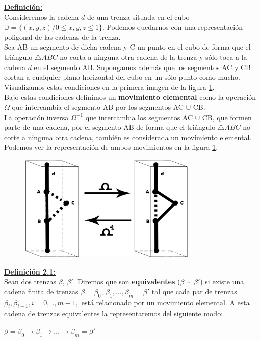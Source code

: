 \textbf{\underline{Definición:}}\\
Consideremos la cadena $d$ de una trenza situada en el cubo $\mathds{D} = \{(x,y,z) / 0 \leq x,y,z \leq 1\}$. Podemos quedarnos con una representación poligonal de las cadenas de la trenza. \\
Sea AB un segmento de dicha cadena y C un punto en el cubo de forma que el triángulo $\triangle ABC$ no corta a ninguna otra cadena de la trenza y sólo toca a la cadena $d$ en el segmento AB. Supongamos además que los segmentos AC y CB cortan a cualquier plano horizontal del cubo en un sólo punto como mucho. Visualizamos estas condiciones en la primera imagen de la figura \ref{elem}.\\
Bajo estas condiciones definimos un \textbf{movimiento elemental} como la operación $ \Omega $ que intercambia el segmento AB por los segmentos AC $ \cup $ CB.\\

La operación inversa $ \Omega^{-1} $ que intercambia los segmentos AC $\cup$  CB, que formen parte de una cadena, por el segmento AB de forma que el triángulo $\triangle ABC$ no corte a ninguna otra cadena, también es considerada un movimiento elemental. \\
Podemos ver la representación de ambos movimientos en la figura \ref{elem}.\\
\begin{figure}[h!]
	\centering
	\includegraphics[width=8.5cm]{itrenzas/elemental.png}
	\caption{}
	\label{elem} 
\end{figure}


\textbf{\underline{Definición 2.1:}}\label{defequi}\\
Sean dos trenzas $\beta$, $\beta'$. Diremos que son \textbf{equivalentes} ($\beta \sim \beta'$) si existe una cadena finita de trenzas $ \beta = \beta_{0}$, $\beta_{1},...,\beta_{m}=\beta'$ tal que cada par de trenzas $ \beta_{i}, \beta_{i+1}, i=0,..,m-1, $ está relacionado por un movimiento elemental. A esta cadena de trenzas equivalentes la representaremos del siguiente modo:
\begin{center}
	$ \beta = \beta_{0} \rightarrow \beta_{1} \rightarrow ... \rightarrow \beta_{m}=\beta'$
\end{center}


